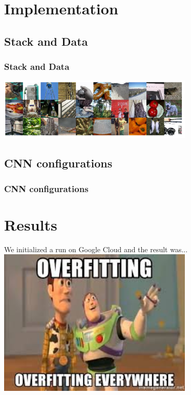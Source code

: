 \documentclass{beamer}
\begin{document}
\section{Implementation}
\subsection{Stack and Data}
\begin{frame}
  \frametitle{Stack and Data}
  \centering
  \includegraphics[width=0.7\textwidth]{images/samples.png}
\end{frame}

\subsection{CNN configurations}
\begin{frame}
  \frametitle{CNN configurations}
  
\end{frame}

\section{Results}
\begin{frame}
  \centering
  We initialized a run on Google Cloud and the result was...\pause
  \vspace{0.02\textheight}
  \includegraphics[width=0.7\textwidth]{images/overfitting.jpeg}
\end{frame}
\end{document}

